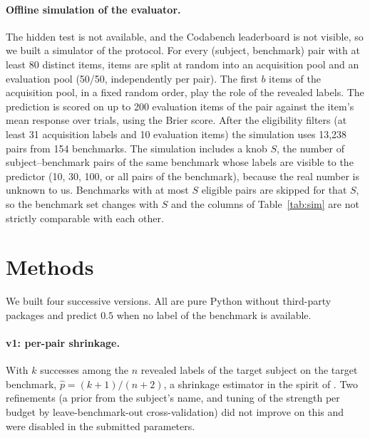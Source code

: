 \documentclass{article}
\begin{document}
\paragraph{Offline simulation of the evaluator.} The hidden test is not available, and the Codabench leaderboard is not visible, so we built a simulator of the protocol. For every (subject, benchmark) pair with at least 80 distinct items, items are split at random into an acquisition pool and an evaluation pool (50/50, independently per pair). The first $b$ items of the acquisition pool, in a fixed random order, play the role of the revealed labels. The prediction is scored on up to 200 evaluation items of the pair against the item's mean response over trials, using the Brier score. After the eligibility filters (at least 31 acquisition labels and 10 evaluation items) the simulation uses 13,238 pairs from 154 benchmarks. The simulation includes a knob $S$, the number of subject--benchmark pairs of the same benchmark whose labels are visible to the predictor (10, 30, 100, or all pairs of the benchmark), because the real number is unknown to us. Benchmarks with at most $S$ eligible pairs are skipped for that $S$, so the benchmark set changes with $S$ and the columns of Table~\ref{tab:sim} are not strictly comparable with each other.

\section{Methods}
\label{sec:methods}
We built four successive versions. All are pure Python without third-party packages and predict $0.5$ when no label of the benchmark is available.

\paragraph{v1: per-pair shrinkage.} With $k$ successes among the $n$ revealed labels of the target subject on the target benchmark, $\hat p=(k+1)/(n+2)$, a shrinkage estimator in the spirit of \citet{efron1973stein}. Two refinements (a prior from the subject's name, and tuning of the strength per budget by leave-benchmark-out cross-validation) did not improve on this and were disabled in the submitted parameters.
\end{document}
